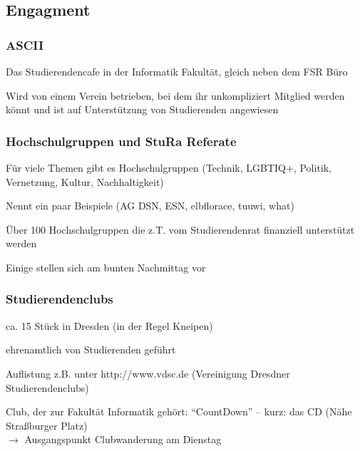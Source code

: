 \documentclass[a4paper,12pt]{scrreprt}
\begin{document}
\subsection{Engagment}

\subsubsection{ASCII}
\begin{itemize*}
    \item Das Studierendencafe in der Informatik Fakultät, gleich neben dem FSR Büro
    \item Wird von einem Verein betrieben, bei dem ihr unkompliziert Mitglied werden könnt und ist auf Unterstützung von Studierenden angewiesen
\end{itemize*}

\subsubsection{Hochschulgruppen und StuRa Referate}
\begin{itemize*}
    \item Für viele Themen gibt es Hochschulgruppen (Technik, LGBTIQ+, Politik, Vernetzung, Kultur, Nachhaltigkeit)
    \item Nennt ein paar Beispiele (AG DSN, ESN, elbflorace, tuuwi, what)
    \item Über 100 Hochschulgruppen die z.T. vom Studierendenrat finanziell unterstützt werden
    \item Einige stellen sich am bunten Nachmittag vor
\end{itemize*}

\subsubsection{Studierendenclubs}
\begin{itemize*}
    \item ca. 15 Stück in Dresden (in der Regel Kneipen)
    \item ehrenamtlich von Studierenden geführt
    \item Auflistung z.B. unter http://www.vdsc.de (Vereinigung Dresdner Studierendenclubs)
    \item Club, der zur Fakultät Informatik gehört: \enquote{CountDown} -- kurz: das CD (Nähe Straßburger Platz)\\
    $\rightarrow$ Ausgangspunkt Clubwanderung am Dienstag
\end{itemize*}
\end{document}
